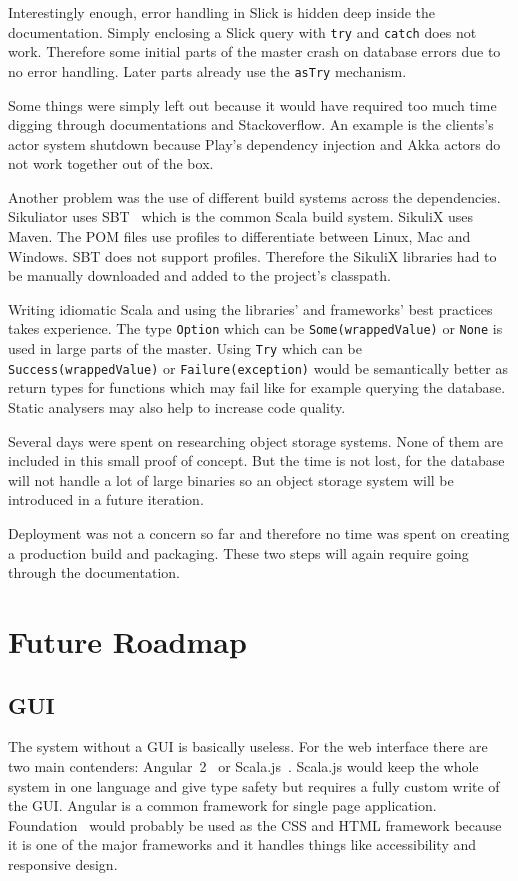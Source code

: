 \documentclass[a4paper,twocolumn,twoside]{article}
\newcommand{\Sik}[0]{Sikuliator}
\begin{document}
Interestingly enough, error handling in Slick is hidden deep inside the documentation.
Simply enclosing a Slick query with \texttt{try} and \texttt{catch} does not work.
Therefore some initial parts of the master crash on database errors due to no error handling.
Later parts already use the \texttt{asTry} mechanism.

Some things were simply left out because it would have required too much time digging through documentations and Stackoverflow. An example is the clients's actor system shutdown because Play's dependency injection and Akka actors do not work together out of the box.

Another problem was the use of different build systems across the dependencies.
\Sik{} uses SBT~\cite{SBT} which is the common Scala build system.
SikuliX uses Maven.
The POM files use profiles to differentiate between Linux, Mac and Windows.
SBT does not support profiles.
Therefore the SikuliX libraries had to be manually downloaded and added to the project's classpath.

Writing idiomatic Scala and using the libraries' and frameworks' best practices takes experience.
The type \texttt{Option} which can be \texttt{Some(wrappedValue)} or \texttt{None} is used in large parts of the master.
Using \texttt{Try} which can be \texttt{Success(wrappedValue)} or \texttt{Failure(exception)} would be semantically better as return types for functions which may fail like for example querying the database.
Static analysers may also help to increase code quality.

Several days were spent on researching object storage systems.
None of them are included in this small proof of concept.
But the time is not lost, for the database will not handle a lot of large binaries so
an object storage system will be introduced in a future iteration.

Deployment was not a concern so far and therefore no time was spent on creating a production build and packaging.
These two steps will again require going through the documentation.



\section{Future Roadmap}

\subsection{GUI}
The system without a GUI is basically useless.
For the web interface there are two main contenders: Angular~2~\cite{Angular2} or Scala.js~\cite{ScalaJs}.
Scala.js would keep the whole system in one language and give type safety but requires a fully custom write of the GUI.
Angular is a common framework for single page application.
Foundation~\cite{Foundation} would probably be used as the CSS and HTML framework 
because it is one of the major frameworks and it handles things like accessibility and responsive design.
\end{document}
